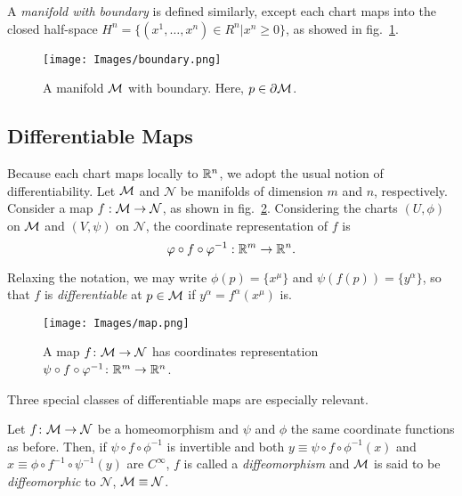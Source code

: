 A \emph{manifold with boundary} is defined similarly, except each chart maps into the closed half-space $H^n = \{ (x^1, \dots, x^n) \in R^n | x^n \geq 0 \}$, as showed in fig.~\ref{fig:boundary}.

\begin{figure}
	\centering
	\texttt{[image: Images/boundary.png]}
	\caption{A manifold $\mathcal{M}$ with boundary. Here, $p \in \partial \mathcal{M}$.}
	\label{fig:boundary}
\end{figure}

\subsection{Differentiable Maps}
Because each chart maps locally to $\mathbb{R}^n$, we adopt the usual notion of differentiability. Let $\mathcal{M}$ and $\mathcal{N} $ be manifolds of dimension $m$ and $n$, respectively. Consider a map $f: \mathcal{M} \to \mathcal{N}$, as shown in fig.~\ref{fig:map}. Considering the charts $(U, \phi)$ on $\mathcal{M}$ and $(V,\psi)$ on $\mathcal{N}$, the coordinate representation of $f$ is
\begin{equation}
	\varphi \circ f \circ \varphi^{-1}: \mathbb{R}^m \to \mathbb{R}^n .
\end{equation}

Relaxing the notation, we may write $\phi(p) = \{x^\mu\}$ and $\psi(f(p)) = \{y^\alpha\}$, so that $f$ is \emph{differentiable} at $p \in \mathcal{M}$ if $y^\alpha = f^\alpha(x^\mu)$ is.

\begin{figure}
	\centering
	\texttt{[image: Images/map.png]}
	\caption{A map $f \colon \mathcal{M} \to \mathcal{N}$ has coordinates representation $\psi \circ f \circ \varphi^{-1} \colon \mathbb{R}^m \to \mathbb{R}^n$.}
	\label{fig:map}
\end{figure}

Three special classes of differentiable maps are especially relevant.

\begin{definition}[Diffeomorphism]
	Let $f \colon \mathcal{M} \to \mathcal{N}$ be a homeomorphism and $\psi$ and $\phi$ the same coordinate functions as before. Then, if $\psi \circ f \circ \phi^{-1}$ is invertible and both $y \equiv \psi \circ f \circ \phi^{-1}(x)$ and $x \equiv \phi \circ f^{-1} \circ \psi^{-1}(y)$ are $C^\infty$, $f$ is called a \emph{diffeomorphism} and $\mathcal{M}$ is said to be \emph{diffeomorphic} to $\mathcal{N}$, $\mathcal{M} \equiv \mathcal{N}$.
\end{definition}

